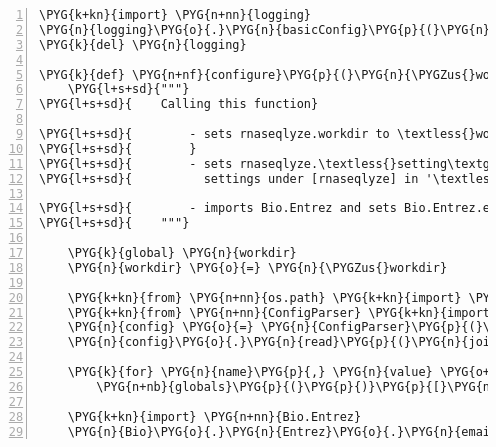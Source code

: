 \begin{Verbatim}[commandchars=\\\{\},numbers=left,firstnumber=1,stepnumber=5]
\PYG{k+kn}{import} \PYG{n+nn}{logging}
\PYG{n}{logging}\PYG{o}{.}\PYG{n}{basicConfig}\PYG{p}{(}\PYG{n}{level}\PYG{o}{=}\PYG{l+m+mi}{0}\PYG{p}{,} \PYG{n}{format}\PYG{o}{=}\PYG{l+s}{"}\PYG{l+s+si}{\PYGZpc{}(levelname)-5.5s}\PYG{l+s}{ [}\PYG{l+s+si}{\PYGZpc{}(name)s}\PYG{l+s}{] }\PYG{l+s+si}{\PYGZpc{}(message)s}\PYG{l+s}{"}\PYG{p}{)}
\PYG{k}{del} \PYG{n}{logging}

\PYG{k}{def} \PYG{n+nf}{configure}\PYG{p}{(}\PYG{n}{\PYGZus{}workdir}\PYG{p}{)}\PYG{p}{:}
    \PYG{l+s+sd}{"""}
\PYG{l+s+sd}{    Calling this function}

\PYG{l+s+sd}{        - sets rnaseqlyze.workdir to \textless{}workdir\textgreater{}}
\PYG{l+s+sd}{        }
\PYG{l+s+sd}{        - sets rnaseqlyze.\textless{}setting\textgreater{} attributes for all}
\PYG{l+s+sd}{          settings under [rnaseqlyze] in '\textless{}workdir\textgreater{}/rnaseqlyze.ini'.}

\PYG{l+s+sd}{        - imports Bio.Entrez and sets Bio.Entrez.email to rnaseqlyze.admin\PYGZus{}email}
\PYG{l+s+sd}{    """}

    \PYG{k}{global} \PYG{n}{workdir}
    \PYG{n}{workdir} \PYG{o}{=} \PYG{n}{\PYGZus{}workdir}

    \PYG{k+kn}{from} \PYG{n+nn}{os.path} \PYG{k+kn}{import} \PYG{n}{join}
    \PYG{k+kn}{from} \PYG{n+nn}{ConfigParser} \PYG{k+kn}{import} \PYG{n}{ConfigParser}
    \PYG{n}{config} \PYG{o}{=} \PYG{n}{ConfigParser}\PYG{p}{(}\PYG{n+nb}{dict}\PYG{p}{(}\PYG{n}{here}\PYG{o}{=}\PYG{n}{workdir}\PYG{p}{)}\PYG{p}{)}
    \PYG{n}{config}\PYG{o}{.}\PYG{n}{read}\PYG{p}{(}\PYG{n}{join}\PYG{p}{(}\PYG{n}{workdir}\PYG{p}{,} \PYG{l+s}{'}\PYG{l+s}{rnaseqlyze.ini}\PYG{l+s}{'}\PYG{p}{)}\PYG{p}{)}

    \PYG{k}{for} \PYG{n}{name}\PYG{p}{,} \PYG{n}{value} \PYG{o+ow}{in} \PYG{n}{config}\PYG{o}{.}\PYG{n}{items}\PYG{p}{(}\PYG{l+s}{"}\PYG{l+s}{rnaseqlyze}\PYG{l+s}{"}\PYG{p}{)}\PYG{p}{:}
        \PYG{n+nb}{globals}\PYG{p}{(}\PYG{p}{)}\PYG{p}{[}\PYG{n}{name}\PYG{p}{]} \PYG{o}{=} \PYG{n}{value}

    \PYG{k+kn}{import} \PYG{n+nn}{Bio.Entrez}
    \PYG{n}{Bio}\PYG{o}{.}\PYG{n}{Entrez}\PYG{o}{.}\PYG{n}{email} \PYG{o}{=} \PYG{n}{admin\PYGZus{}email}
\end{Verbatim}



